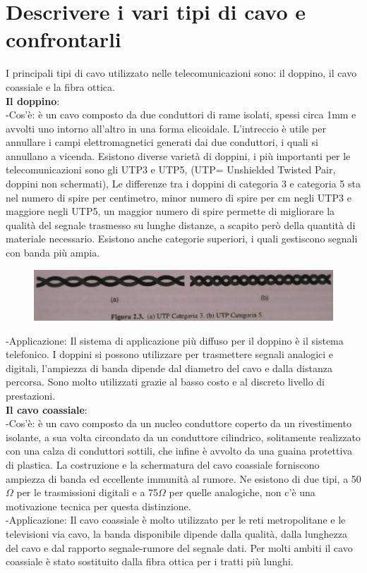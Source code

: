 \section{Descrivere i vari tipi di cavo e confrontarli}
I principali tipi di cavo utilizzato nelle telecomunicazioni sono: il doppino, il cavo coassiale e la fibra ottica. \\
\textbf{Il doppino}:\\
-Cos’è: è un cavo composto da due conduttori di rame isolati, spessi circa 1mm e avvolti uno intorno all’altro in una forma elicoidale. L’intreccio è utile per annullare i campi elettromagnetici generati dai due conduttori, i quali si annullano a vicenda. Esistono diverse varietà di doppini, i più importanti per le telecomunicazioni sono gli UTP3 e UTP5, (UTP= Unshielded Twisted Pair, doppini non schermati), Le differenze tra i doppini di categoria 3 e categoria 5 sta nel numero di spire per centimetro, minor numero di spire per cm negli UTP3 e maggiore negli UTP5, un maggior numero di spire permette di migliorare la qualità del segnale trasmesso su lunghe distanze, a scapito però della quantità di materiale necessario. Esistono anche categorie superiori, i quali gestiscono segnali con banda più ampia.  \\

\begin{figure}[H]
\centering
\includegraphics[scale=0.7]{res/img/3_Doppino.jpg}
\end{figure}
-Applicazione: Il sistema di applicazione più diffuso per il doppino è il sistema telefonico. I doppini si 	possono utilizzare per trasmettere segnali analogici e digitali, l’ampiezza di banda dipende dal diametro del cavo e dalla distanza percorsa. Sono molto utilizzati grazie al basso costo e al discreto livello di prestazioni. \\
\textbf{Il cavo coassiale}: \\
-Cos’è: è un cavo composto da un nucleo conduttore coperto da un rivestimento isolante, a sua volta circondato da un conduttore cilindrico, solitamente realizzato con una calza di conduttori sottili, che infine è avvolto da una guaina protettiva di plastica. La costruzione e la schermatura del cavo coassiale forniscono ampiezza di banda ed eccellente immunità al rumore. Ne esistono di due tipi, a 50$\Omega$ per le trasmissioni digitali e a 75$\Omega$ per quelle analogiche, non c’è una motivazione tecnica per questa distinzione.\\
-Applicazione: Il cavo coassiale è molto utilizzato per le reti metropolitane e le televisioni via cavo, la banda disponibile dipende dalla qualità, dalla lunghezza del cavo e dal rapporto segnale-rumore del segnale dati. Per molti ambiti il cavo coassiale è stato sostituito dalla fibra ottica per i tratti più lunghi.

